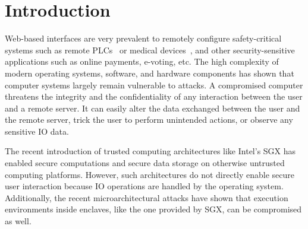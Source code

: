 \section{Introduction}
\label{sec:intro}

Web-based interfaces are very prevalent to remotely configure safety-critical systems such as remote PLCs~\cite{controlbyweb} or medical devices~\cite{medicalDevice}, and other security-sensitive applications such as online payments, e-voting, etc. The high complexity of modern operating systems, software, and hardware components has shown that computer systems largely remain vulnerable to attacks. A compromised computer threatens the integrity and the confidentiality of any interaction between the user and a remote server. It can easily alter the data exchanged between the user and the remote server, trick the user to perform unintended actions, or observe any sensitive IO data. 


The recent introduction of trusted computing architectures like Intel's SGX has enabled secure computations and secure data storage on otherwise untrusted computing platforms. However, such architectures do not directly enable secure user interaction because IO operations are handled by the operating system. Additionally, the recent microarchitectural attacks have shown that execution environments inside enclaves, like the one provided by SGX, can be compromised as well.

\iffalse
\begin{figure}[t]
\centering
\texttt{[image: motivation.pdf]}
\caption{\textbf{Motivating examples.} 1) Pointer based UI elements that sets parameters to remote safety-critical device, 2) E-voting where the voting privacy and integrity is critical, 3) Financial transactions such as bitcoin wallet that shows sensitive information such as the user's private key and 4) web applications that provide an option for the user to reveal credentials.}
\spacesave
\label{fig:motivation}
\centering
\end{figure}
\fi

\iffalse
\begin{figure}[t]
\centering
\texttt{[image: systemModel\_all.pdf]}
\caption{\textbf{Trusted path.} The figures shows the system and the attacker model of the trusted path. We generally consider two trusted path scenarios, \one trusted path to a remote server, and \two trusted path to a trusted execution environment (TEE) such as the Intel SGX.}
\spacesave
\label{fig:trustedPath}
\centering 
\end{figure}
\fi


